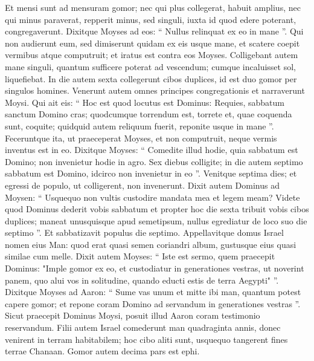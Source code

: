 \begin{biblechapter}
\begin{biblechapter}
\begin{biblechapter}
\begin{biblechapter}
\begin{biblechapter}
\begin{biblechapter}
\begin{biblechapter}
\begin{biblechapter}
\begin{biblechapter}
\begin{biblechapter}
\begin{biblechapter}
\begin{biblechapter}
\begin{biblechapter}
\begin{biblechapter}
\begin{biblechapter}
\begin{biblechapter}
 \verse Et mensi sunt ad mensuram gomor; nec qui plus collegerat, habuit amplius, nec qui minus paraverat, repperit minus, sed singuli, iuxta id quod edere poterant, congregaverunt.
 \verse Dixitque Moyses ad eos: “ Nullus relinquat ex eo in mane ”. 
\verse Qui non audierunt eum, sed dimiserunt quidam ex eis usque mane, et scatere coepit vermibus atque computruit; et iratus est contra eos Moyses. 
\verse Colligebant autem mane singuli, quantum sufficere poterat ad vescendum; cumque incaluisset sol, liquefiebat.
 \verse In die autem sexta collegerunt cibos duplices, id est duo gomor per singulos homines. Venerunt autem omnes principes congregationis et narraverunt Moysi. 
 \verse Qui ait eis: “ Hoc est quod locutus est Dominus: Requies, sabbatum sanctum Domino cras; quodcumque torrendum est, torrete et, quae coquenda sunt, coquite; quidquid autem reliquum fuerit, reponite usque in mane ”. 
\verse Feceruntque ita, ut praeceperat Moyses, et non computruit, neque vermis inventus est in eo. 
 \verse Dixitque Moyses: “ Comedite illud hodie, quia sabbatum est Domino; non invenietur hodie in agro. 
\verse Sex diebus colligite; in die autem septimo sabbatum est Domino, idcirco non invenietur in eo ”.
 \verse Venitque septima dies; et egressi de populo, ut colligerent, non invenerunt. 
\verse Dixit autem Dominus ad Moysen: “ Usquequo non vultis custodire mandata mea et legem meam? 
\verse Videte quod Dominus dederit vobis sabbatum et propter hoc die sexta tribuit vobis cibos duplices; maneat unusquisque apud semetipsum, nullus egrediatur de loco suo die septimo ”. 
\verse Et sabbatizavit populus die septimo.
 \verse Appellavitque domus Israel nomen eius Man: quod erat quasi semen coriandri album, gustusque eius quasi similae cum melle.
 \verse Dixit autem Moyses: “ Iste est sermo, quem praecepit Dominus: "Imple gomor ex eo, et custodiatur in generationes vestras, ut noverint panem, quo alui vos in solitudine, quando educti estis de terra Aegypti" ”. 
\verse Dixitque Moyses ad Aaron: “ Sume vas unum et mitte ibi man, quantum potest capere gomor; et repone coram Domino ad servandum in generationes vestras ”. 
\verse Sicut praecepit Dominus Moysi, posuit illud Aaron coram testimonio reservandum.
 \verse Filii autem Israel comederunt man quadraginta annis, donec venirent in terram habitabilem; hoc cibo aliti sunt, usquequo tangerent fines terrae Chanaan. 
 \verse Gomor autem decima pars est ephi.
 

\end{biblechapter}
\end{biblechapter}
\end{biblechapter}
\end{biblechapter}
\end{biblechapter}
\end{biblechapter}
\end{biblechapter}
\end{biblechapter}
\end{biblechapter}
\end{biblechapter}
\end{biblechapter}
\end{biblechapter}
\end{biblechapter}
\end{biblechapter}
\end{biblechapter}
\end{biblechapter}
